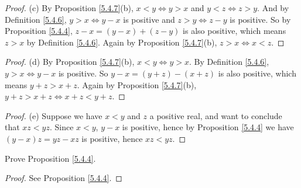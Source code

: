 \begin{proof}{(c)}
By Proposition \ref{5.4.7}(b), \(x < y \iff y > x\) and \(y < z \iff z > y\).
And by Definition \ref{5.4.6}, \(y > x \iff y - x\) is positive and \(z > y \iff z - y\) is positive.
So by Proposition \ref{5.4.4}, \(z - x = (y - x) + (z - y)\) is also positive, which means \(z > x\) by Definition \ref{5.4.6}.
Again by Proposition \ref{5.4.7}(b), \(z > x \iff x < z\).
\end{proof}

\begin{proof}{(d)}
By Proposition \ref{5.4.7}(b), \(x < y \iff y > x\).
By Definition \ref{5.4.6}, \(y > x \iff y - x\) is positive.
So \(y - x = (y + z) - (x + z)\) is also positive, which means \(y + z > x + z\).
Again by Proposition \ref{5.4.7}(b), \(y + z > x + z \iff x + z < y + z\).
\end{proof}

\begin{proof}{(e)}
Suppose we have \(x < y\) and \(z\) a positive real, and want to conclude that \(xz < yz\).
Since \(x < y\), \(y - x\) is positive, hence by Proposition \ref{5.4.4} we have \((y - x)z = yz - xz\) is positive, hence \(xz < yz\).
\end{proof}

\exercisesection

\begin{exercise}\label{ex 5.4.1}
Prove Proposition \ref{5.4.4}.
\end{exercise}

\begin{proof}
See Proposition \ref{5.4.4}.
\end{proof}